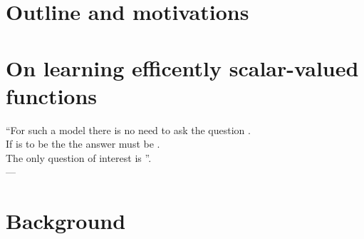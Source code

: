\chapter{Outline and motivations}
\label{ch:motivations}


\chapter{On learning efficently scalar-valued functions}
\label{ch:motivations}
\bigskip
\begin{flushright}
    ``For such a model there is no need to ask the question . \\
    If  is to be the  the answer must
    be . \\
    The only question of interest is ''. \\
    --- 
    \citep{box1979robustness}
\end{flushright}
\bigskip
\begin{justify}
\end{justify}
\minitoc


\chapter{Background}
\label{ch:background}
\bigskip
\begin{justify}
\end{justify}
\minitoc

